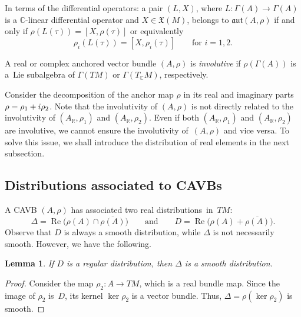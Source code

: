 \documentclass[11pt]{article}
\numberwithin{equation}{section}
\numberwithin{equation}{section}
\newtheorem{Lemma}[Theorem]{Lemma}
\newcommand{\R}{{\mathbb{R}}}
\newcommand{\C}{{\mathbb{C}}}
\DeclareMathOperator{\re}{Re}
\begin{document}
In terms of the differential operators: a pair $(L,X)$, where $L\colon \Gamma(A)\to \Gamma(A)$ is a $\C$-linear differential operator and $X\in \mathfrak{X}(M)$, belongs to $\mathfrak{aut}(A,\rho)$ if and only if $\rho(L(\tau))=[X,\rho(\tau)]$
or equivalently
\begin{equation*}%
\rho_i(L(\tau))=[X, \rho_i(\tau)]\qquad\text{for $i=1,2$}.
\end{equation*}
\begin{Definition}
A real or complex anchored vector bundle $(A,\rho)$ is {\em involutive} if $\rho(\Gamma(A))$ is a~Lie subalgebra of $\Gamma(TM)$ or $\Gamma(T_{\C}M)$, respectively.
\end{Definition}

Consider the decomposition of the anchor map $\rho$ in its real and imaginary parts ${\rho=\rho_1+{\rm i}\rho_2}$. Note that the involutivity of $(A,\rho)$ is not directly related to the involutivity of $(A_{\R}, \rho_1)$ and $(A_{\R}, \rho_2)$. Even if both $(A_{\R}, \rho_1)$ and $(A_{\R}, \rho_2)$ are involutive, we cannot ensure the involutivity of~$(A,\rho)$ and vice versa. To solve this issue, we shall introduce the distribution of real elements in the next subsection.

\subsection{Distributions associated to CAVBs}
A CAVB $(A,\rho)$ has associated two real distributions~in~$TM$:
 \[\Delta=\re \bigl(\rho(A)\cap \overline{\rho(A)}\bigr)\qquad\text{and} \qquad D=\re \bigl(\rho(A) + \overline{\rho(A)}\bigr).\]
Observe that $D$ is always a smooth distribution, while $\Delta$ is not necessarily smooth. However, we have the following.

 \begin{Lemma}\label{imageanchor}
 If $D$ is a regular distribution, then $\Delta$ is a smooth distribution.
 \end{Lemma}
\begin{proof}
 Consider the map $\rho_2\colon A\to TM$, which is a real bundle map. Since the image of $\rho_2$ is~$D$, its kernel $\ker \rho_2$ is a vector bundle. Thus, $\Delta=\rho(\ker \rho_2)$ is smooth.
\end{proof}
\end{document}
